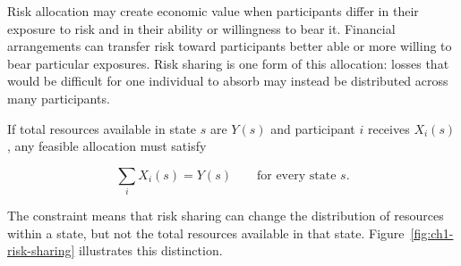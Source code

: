 Risk allocation may create economic value when participants differ in their exposure to risk and in their ability or willingness to bear it. Financial arrangements can transfer risk toward participants better able or more willing to bear particular exposures. Risk sharing is one form of this allocation: losses that would be difficult for one individual to absorb may instead be distributed across many participants.

If total resources available in state $s$ are $Y(s)$ and participant $i$ receives $X_i(s)$, any feasible allocation must satisfy

\begin{equation}
\sum_i X_i(s)=Y(s)
\qquad \text{for every state }s.
\label{eq:ch1_risk_sharing}
\end{equation}

The constraint means that risk sharing can change the distribution of resources within a state, but not the total resources available in that state. Figure~\ref{fig:ch1-risk-sharing} illustrates this distinction.

